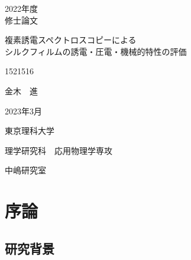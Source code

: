 \documentclass[dvipdfmx,12pt,a4paper]{jreport}
\begin{document}
	\begin{titlepage}
		
		\begin{center}
			
			\vspace{20truept}
			{\LARGE 2022年度}\\
			\vspace{15truept}
			{\LARGE 修士論文}
			
			\vspace{50truept}
			
			{\LARGE 複素誘電スペクトロスコピーによる\\シルクフィルムの誘電・圧電・機械的特性の評価}\\
			\vspace{10truept}
			
			\vspace*{280truept}
			
			{\LARGE 1521516}\\
			\vspace{5truept}
			
			{\LARGE 金木　進}\\
			\vspace{60truept}
			
			{\LARGE 2023年3月}
			\vspace{30truept}
			
			{\LARGE 東京理科大学}\\
			\vspace{15truept}
			
			{\LARGE 理学研究科　応用物理学専攻}\\
			\vspace{15truept}
			
			{\LARGE 中嶋研究室}\\
			
		\end{center}
		
		
	\end{titlepage}
  \thispagestyle{empty}
	\clearpage
\addtocounter{page}{0}
\tableofcontents
  \chapter{序論}
		\section{研究背景}
\end{document}
